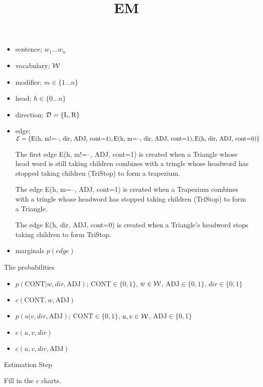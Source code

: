 \documentclass{article}
\title{EM }
\begin{document}
\date{}
\maketitle{}

\begin{itemize}
\item sentence; $w_1 \ldots w_n$
\item vocabulary; ${\cal W}$
\item modifier; $m \in \{1 \ldots n\}$
\item head; $h \in \{0 \ldots n\}$
\item direction; ${\cal D}= \{\textrm{L}, \textrm{R}\}$
\item edge; ${\cal E}= \{\textrm{E(h, m!=--, dir, ADJ, cont=1)}, \textrm{E(h, m=--, dir, ADJ, cont=1)}, \textrm{E(h, dir, ADJ, cont=0)}\}$

The first edge \textrm{E(h, m!=--, ADJ, cont=1)} is created when a Triangle whose head word is still taking children combines with a tringle whose headword has stopped taking children (TriStop) to form a trapezium.

The edge \textrm{E(h, m=--, ADJ, cont=1)} is created when a Trapezium combines with a tringle whose headword has stopped taking children (TriStop) to form a Triangle.

The edge \textrm{E(h, dir, ADJ, cont=0)} is created when a Triangle's headword stops taking children to form TriStop.


\item marginals $p(edge)$
\end{itemize}


The probabilities 

\begin{itemize}
\item $p(\mathrm{CONT} | w, dir, \mathrm{ADJ})$; $\mathrm{CONT} \in \{0, 1\}$,  $w \in {\cal W}$, $\mathrm{ADJ} \in \{0, 1\}$, $dir \in \{0,1\}$
\item $c(\mathrm{CONT}, w, \mathrm{ADJ})$
\item $p(u | v, dir, \mathrm{ADJ})$; $\mathrm{CONT} \in \{0, 1\}$,  $u, v \in {\cal W}$, $\mathrm{ADJ} \in \{0, 1\}$
\item $c(u, v, dir)$
\item $c(u, v, dir, \mathrm{ADJ})$

\end{itemize}



Estimation Step


Fill in the $c$ charts. 
\end{document}
